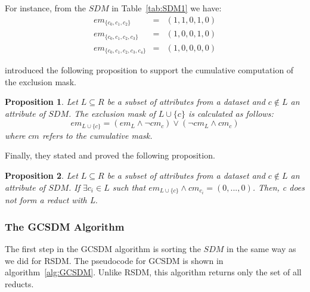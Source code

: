 \documentclass[authoryear,11pt]{elsarticle}
\newtheorem{proposition}{Proposition}
\begin{document}
	For instance, from the $SDM$ in Table~\ref{tab:SDM1} we have:
	$$\begin{array}{lcc}
	  em_{\lbrace c_0,c_1,c_2\rbrace}         &=& (1,1,0,1,0)\\
	  em_{\lbrace c_0,c_1,c_2,c_3\rbrace}     &=& (1,0,0,1,0)\\
	  em_{\lbrace c_0,c_1,c_2,c_3,c_4\rbrace} &=& (1,0,0,0,0)
	\end{array}$$
	
	\cite{Lias13} introduced the following proposition to support the cumulative computation of the exclusion mask.
	
	\begin{proposition}\label{prop:cumul} 
		Let $L \subseteq R$ be a subset of attributes from a dataset and $c \notin L$ an attribute of $SDM$.
		The exclusion mask of $L \cup \lbrace c\rbrace$ is calculated as follows:
		$$em_{L \cup \lbrace c\rbrace}=(em_L \wedge \neg cm_c) \vee (\neg cm_L \wedge cm_c)$$
		where $cm$ refers to the cumulative mask.
	\end{proposition}
	
	Finally, they stated and proved the following proposition.
	
	\begin{proposition}\label{prop:exclude} 
		Let $L \subseteq R$ be a subset of attributes from a dataset and $c \notin L$ an attribute of $SDM$.
		If $\exists c_i \in L$ such that $em_{L \cup \lbrace c\rbrace} \wedge cm_{c_i}=(0,...,0)$. Then, c
		does not form a reduct with L.
	\end{proposition}
	
	
\subsubsection{The GCSDM Algorithm}	

	The first step in the GCSDM algorithm is sorting the $SDM$ in the same way as we did for RSDM. 
	The pseudocode for GCSDM is shown in algorithm~\ref{alg:GCSDM}. Unlike RSDM, this algorithm returns
	only the set of all reducts.
	
\end{document}
